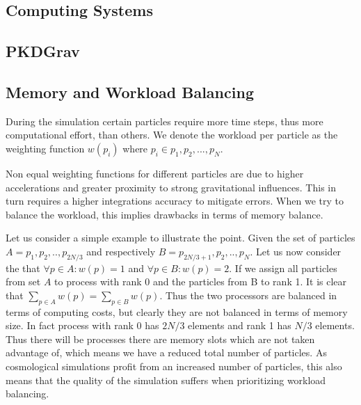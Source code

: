 \documentclass[]{article}
\begin{document}

\subsection{Computing Systems}


\subsection{PKDGrav}


\subsection{Memory and Workload Balancing}\label{sec:balancing}
During the simulation certain particles require more time steps, thus more computational effort, than others. We denote the workload per particle as the weighting function $w(p_i)$ where $p_i \in {p_1, p_2, ..., p_N}$.

Non equal weighting functions for different particles are due to higher accelerations and greater proximity to strong gravitational influences. This in turn requires a higher integrations accuracy to mitigate errors. When we try to balance the workload, this implies drawbacks in terms of memory balance. 

Let us consider a simple example to illustrate the point. Given the set of particles $A = {p_1, p_2, .., p_{2N/3}}$ and respectively $B = {p_{2N/3 + 1}, p_2, .., p_{N}}$. Let us now consider the that $\forall p \in A : w(p) = 1$ and $\forall p \in B : w(p) = 2$. If we assign all particles from set $A$ to process with rank 0 and the particles from B to rank 1. It is clear that $\sum_{p\in A}^{} w(p) = \sum_{p\in B}^{} w(p)$. Thus the two processors are balanced in terms of computing costs, but clearly they are not balanced in terms of memory size. In fact process with rank 0 has $2N/3$ elements and rank 1 has $N/3$ elements. Thus there will be processes there are memory slots which are not taken advantage of, which means we have a reduced total number of particles. As cosmological simulations profit from an increased number of particles, this also means that the quality of the simulation suffers when prioritizing workload balancing.
\end{document}
